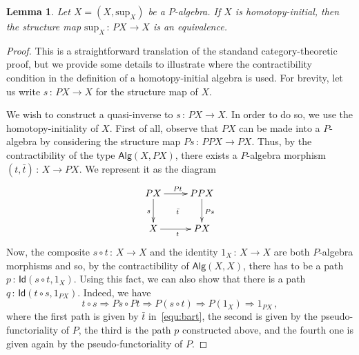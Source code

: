 \documentclass[10pt,a4paper,oneside,reqno]{amsart}
\newcommand{\xycenter}[1]{\vcenter{\hbox{\xymatrix{#1}}}}
\theoremstyle{mythm}
\newtheorem{lemma}[theorem]{Lemma}
\theoremstyle{mydef}
\theoremstyle{myrmk}
\newcommand{\co}{\,{:}\,}
\newcommand{\Id}{\mathsf{Id}}
\newcommand{\Palg}{\mathsf{Alg}}
\renewcommand{\sup}{\mathrm{sup}}
\begin{document}
\begin{lemma}\label{lem:IntLambek} Let $X = (X, \sup_X)$ be a $P$-algebra. 
If $X$ is homotopy-initial, then the structure map $\sup_X \co PX \to X$ is an equivalence.
\end{lemma}


\begin{proof} This is a straightforward translation of the standand category-theoretic proof, but we provide
some details to illustrate where the contractibility condition in the definition of a homotopy-initial algebra is
used. For brevity, let us write $s \co PX \to X$ for the structure map of $X$. 

 We wish to construct a quasi-inverse to $s \co PX \to X$. In order to do so, we use the homotopy-initiality
of $X$. First of all, observe that $PX$ can be made into a $P$-algebra by considering the structure map 
$Ps \co PPX \to PX$. Thus, by the contractibility of the type $\Palg(X, PX)$, there exists a $P$-algebra
morphism $(t, \bar{t}) \co X \to PX$. We represent it as the diagram
\begin{equation}
\label{equ:bart}
\xycenter{
PX \ar[d]_{s} \ar[r]^{Pt} \ar@{}[dr]|{\bar{t}}& PPX \ar[d]^{Ps} \\
X \ar[r]_{t} & PX}
\end{equation}
Now, the composite $s \circ t \co X \to X$ and the identity $1_X \co X \to X$ are both $P$-algebra
morphisms and so, by the contractibility of $\Palg(X,X)$, there has to be a path $p \co \Id(s\circ t ,1_X)$. 
Using this fact, we can also show that there is a path $q \co \Id(t \circ s, 1_{PX})$. Indeed, we have
\[
t \circ s  \Rightarrow Ps \circ Pt 
 \Rightarrow P(s \circ t) 
 \Rightarrow P(1_X) 
  \Rightarrow 1_{PX} \, ,
\]
where the first path is given by $\bar{t}$ in~\eqref{equ:bart}, the second is given by the pseudo-functoriality of $P$,
the third is the path $p$ constructed above, and the fourth one is given again by the pseudo-functoriality of $P$. 
\end{proof}
\end{document}
